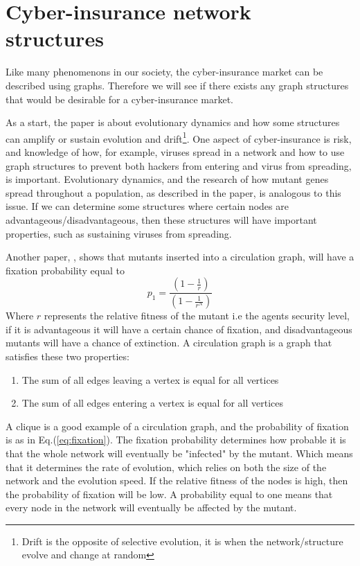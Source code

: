 \section{Cyber-insurance network structures}

Like many phenomenons in our society, the cyber-insurance market can be described using graphs. Therefore we will see if there exists any graph structures that would be desirable for a cyber-insurance market.

As a start, the paper \cite{lieberman2005evolutionary} is about evolutionary dynamics and how some structures
can amplify or sustain evolution and drift\footnote{Drift is the opposite of selective evolution, it is when the network/structure evolve and change at random}.
One aspect of cyber-insurance is risk, and knowledge of how, for example, viruses spread in a network and how to use graph structures to prevent both hackers from entering and virus from spreading, is important. Evolutionary dynamics, and the research of how mutant genes spread throughout a population, as described in the paper, is analogous to this issue.
If we can determine some structures where certain nodes are advantageous/disadvantageous, then these structures will have important properties, such as sustaining viruses from spreading.

Another paper, \cite{lieberman2005evolutionary}, shows that mutants inserted into a circulation graph, will have a fixation probability equal to
\begin{equation}  
p_{1}=\frac{(1-\frac{1}{r})}{(1-\frac{1}{r^{N}})}
 \label{eq:fixation} 
\end{equation}
Where $r$ represents the relative fitness of the mutant i.e the agents security level, if it is advantageous it will have a certain chance of fixation, and disadvantageous mutants will have a chance of extinction. A circulation graph is a graph that satisfies these two properties: 
\begin{enumerate}
\item The sum of all edges leaving a vertex is equal for all vertices
\item The sum of all edges entering a vertex is equal for all vertices
\end{enumerate}
A clique is a good example of a circulation graph, and the probability of fixation is as in Eq.(\ref{eq:fixation}).
The fixation probability determines how probable it is that the whole network will eventually be
"infected" by the mutant. Which means that it determines the rate of evolution, which relies on both the size of the
network and the evolution speed. 
If the relative fitness of the nodes is high, then the probability of fixation will be low.
A probability equal to one means that every node in the network will eventually be affected by the mutant.

